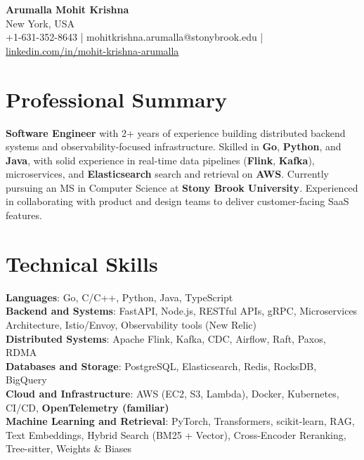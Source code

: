 \documentclass[letterpaper,11pt]{article}
\begin{document}
\begin{center}
  {\Large \textbf{Arumalla Mohit Krishna}} \\
  New York, USA \\
  +1-631-352-8643 \enspace | \enspace mohitkrishna.arumalla@stonybrook.edu \enspace | \enspace \href{https://www.linkedin.com/in/mohit-krishna-arumalla}{linkedin.com/in/mohit-krishna-arumalla}
\end{center}

\section{Professional Summary}
  \begin{itemize}[leftmargin=0.15in, label={}]
    \small{\item{
     \textbf{Software Engineer} with 2+ years of experience building distributed backend systems and observability-focused infrastructure. Skilled in \textbf{Go}, \textbf{Python}, and \textbf{Java}, with solid experience in real-time data pipelines (\textbf{Flink}, \textbf{Kafka}), microservices, and \textbf{Elasticsearch} search and retrieval on \textbf{AWS}. Currently pursuing an MS in Computer Science at \textbf{Stony Brook University}. Experienced in collaborating with product and design teams to deliver customer-facing SaaS features.
    }}
  \end{itemize}
\vspace{-16pt}

\section{Technical Skills}
 \begin{itemize}[leftmargin=0.15in, label={}]
    \small{\item{
     \textbf{Languages}: Go, C/C++, Python, Java, TypeScript \\
     \textbf{Backend and Systems}: FastAPI, Node.js, RESTful APIs, gRPC, Microservices Architecture, Istio/Envoy, Observability tools (New Relic) \\
     \textbf{Distributed Systems}: Apache Flink, Kafka, CDC, Airflow, Raft, Paxos, RDMA \\
     \textbf{Databases and Storage}: PostgreSQL, Elasticsearch, Redis, RocksDB, BigQuery \\
     \textbf{Cloud and Infrastructure}: AWS (EC2, S3, Lambda), Docker, Kubernetes, CI/CD, \textbf{OpenTelemetry (familiar)} \\
     \textbf{Machine Learning and Retrieval}: PyTorch, Transformers, scikit-learn, RAG, Text Embeddings, Hybrid Search (BM25 + Vector), Cross-Encoder Reranking, Tree-sitter, Weights \& Biases
    }}
 \end{itemize}
\vspace{-16pt}
\end{document}
